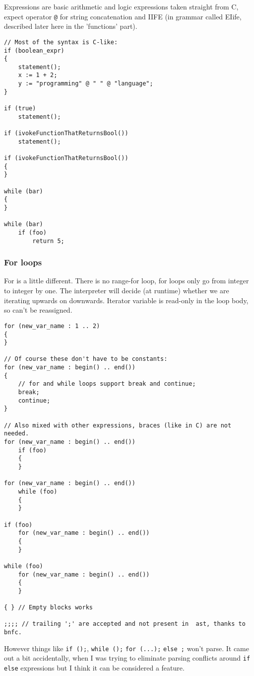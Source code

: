 \documentclass[11pt]{article}
\begin{document}
Expressions are basic arithmetic and logic expressions taken straight from C,
expect operator \texttt{@} for string concatenation and IIFE (in grammar
called EIife, described later here in the 'functions' part).

\begin{verbatim}
// Most of the syntax is C-like:
if (boolean_expr)
{
    statement();
    x := 1 + 2;
    y := "programming" @ " " @ "language";
}

if (true)
    statement();

if (ivokeFunctionThatReturnsBool())
    statement();

if (ivokeFunctionThatReturnsBool())
{
}

while (bar)
{
}

while (bar)
    if (foo)
        return 5;
\end{verbatim}

\subsubsection*{For loops}
\label{sec:org7e31714}
For is a little different. There is no range-for loop, for loops only go
from integer to integer by one. The interpreter will decide (at runtime)
whether we are iterating upwards on downwards. Iterator variable is
read-only in the loop body, so can't be reassigned.

\begin{verbatim}
for (new_var_name : 1 .. 2)
{
}

// Of course these don't have to be constants:
for (new_var_name : begin() .. end())
{
    // for and while loops support break and continue;
    break;
    continue;
}

// Also mixed with other expressions, braces (like in C) are not needed.
for (new_var_name : begin() .. end())
    if (foo)
    {
    }

for (new_var_name : begin() .. end())
    while (foo)
    {
    }

if (foo)
    for (new_var_name : begin() .. end())
    {
    }

while (foo)
    for (new_var_name : begin() .. end())
    {
    }

{ } // Empty blocks works

;;;; // trailing ';' are accepted and not present in  ast, thanks to bnfc.
\end{verbatim}

However things like \texttt{if ();}, \texttt{while ();} \texttt{for (...);}
\texttt{else ;} won't parse. It came out a bit accidentally, when I was
trying to eliminate parsing conflicts around \texttt{if else} expressions but I think
it can be considered a feature.
\end{document}
